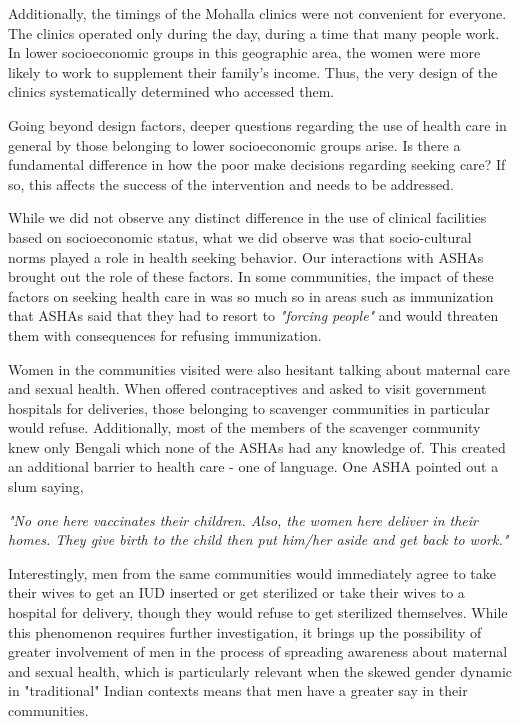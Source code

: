 Additionally, the timings of the Mohalla clinics were not convenient for everyone. The clinics operated only during the day, during a time that many people work. In lower socioeconomic groups in this geographic area, the women were more likely to work to supplement their family's income. Thus, the very design of the clinics systematically determined who accessed them.

Going beyond design factors, deeper questions regarding the use of health care in general by those belonging to lower socioeconomic groups arise. Is there a fundamental difference in how the poor make decisions regarding seeking care? If so, this affects the success of the intervention and needs to be addressed.

While we did not observe any distinct difference in the use of clinical facilities based on socioeconomic status, what we did observe was that socio-cultural norms played a role in health seeking behavior. Our interactions with ASHAs brought out the role of these factors. In some communities, the impact of these factors on seeking health care in was so much so in areas such as immunization that ASHAs said that they had to resort to \textit{"forcing people"} and would threaten them with consequences for refusing immunization.

Women in the communities visited were also hesitant talking about maternal care and sexual health. When offered contraceptives and asked to visit government hospitals for deliveries, those belonging to scavenger communities in particular would refuse. Additionally, most of the members of the scavenger community knew only Bengali which none of the ASHAs had any knowledge of. This created an additional barrier to health care - one of language. One ASHA pointed out a slum saying,

\textit{"No one here vaccinates their children. Also, the women here deliver in their homes. They give birth to the child then put him/her aside and get back to work."} 

Interestingly, men from the same communities would immediately agree to take their wives to get an IUD inserted or get sterilized or take their wives to a hospital for delivery, though they would refuse to get sterilized themselves. While this phenomenon requires further investigation, it brings up the possibility of greater involvement of men in the process of spreading awareness about maternal and sexual health, which is particularly relevant when the skewed gender dynamic in "traditional" Indian contexts means that men have a greater say in their communities. %

